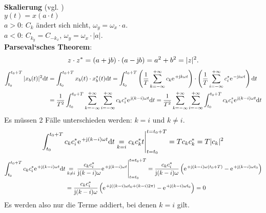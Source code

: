 \documentclass[11pt,a4paper,DIV=12]{scrartcl}
\newcommand{\diff}{\mathrm{d}}
\begin{document}
%
\textbf{Skalierung} (vgl. \cite[Kap. 1, S. 22]{Butz2012})\\
$y(t) = x(a\cdot t)$	\\
$a>0$: $C_k$ ändert sich nicht, $\omega_y = \omega_x \cdot a$.\\
$a<0$: $C_{k_y} = C_{-k_x}$, $\omega_y = \omega_x \cdot |a|$.\\
\textbf{Parseval`sches Theorem}:
\begin{align}
	z\cdot z^*=(a+\im b)\cdot (a-\im b)=a^2+b^2=|z|^2.
\end{align}
%
%
\begin{align}
	\int_{t_0}^{t_0+T}|x_b(t)|^2\diff t
	&=\int_{t_0}^{t_0+T}x_b(t)\cdot x_b^*(t)\diff t
	=\int_{t_0}^{t_0+T}\left (\frac{1}{T}\sum_{k=-\infty}^{+\infty}c_k\e^{+\im k \omega t}\right )\cdot \left (\frac{1}{T}\sum_{i=-\infty}^{+\infty}c_i^*\e^{-\im i \omega t}\right )\diff t\nonumber \\
	&=\frac{1}{T^2}\int_{t_0}^{t_0+T}\sum_{k=-\infty}^{+\infty}\sum_{i=-\infty}^{+\infty}c_kc_i^*\e^{\im (k-i)\omega t}\diff t =\frac{1}{T^2}\sum_{k=-\infty}^{+\infty}\sum_{i=-\infty}^{+\infty}\int_{t_0}^{t_0+T}c_kc_i^*\e^{\im (k-i)\omega t}\diff t
\end{align}
%
Es müssen 2 Fälle unterschieden werden: $k=i$ und $k\neq i$.
%
\begin{align}
	\int_{t_0}^{t_0+T}c_kc_i^*\e^{+\im (k-i)\omega t}\diff t \underset{k=i}{=}c_kc_k^*t\Bigg |_{t=t_0}^{t=t_0+T}=Tc_kc_k^*=T|c_k|^2
\end{align}
%
\begin{align}
	\int_{t_0}^{t_0+T}c_kc_i^*\e^{+\im (k-i)\omega t}\diff t
	&\underset{k\neq i}{=}\frac{c_kc_i^*}{\im (k-i) \omega }\e^{+\im (k-i)\omega t}\Bigg |_{t=t_0}^{t=t_0+T}
	=\frac{c_kc_i^*}{\im (k-i) \omega }\left (\e^{+\im (k-i)\omega (t_0+T)}-\e^{+\im (k-i)\omega t_0}\right )\nonumber \\
	&=\frac{c_kc_i^*}{\im (k-i) \omega }\left (\e^{+\im ((k-i)\omega t_0+(k-i)2\pi)}-\e^{+\im (k-i)\omega t_0}\right )=0
\end{align}
Es werden also nur die Terme addiert, bei denen $k=i$ gilt.
%
\end{document}
